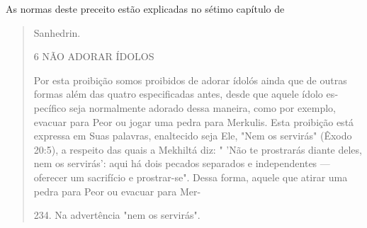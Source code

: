 As normas deste preceito estão explicadas no sétimo capítulo de

\begin{quote}
Sanhedrin.

6 NÃO ADORAR ÍDOLOS

Por esta proibição somos proibidos de adorar ídolós ainda que de outras
formas além das quatro especificadas antes, desde que aquele ídolo
es­pecífico seja normalmente adorado dessa maneira, como por exemplo,
evacuar para Peor ou jogar uma pedra para Merkulis. Esta proibição está
expressa em Suas palavras, enaltecido seja Ele, "Nem os servirás" (Êxodo
20:5), a respeito das quais a Mekhiltá diz: " 'Não te prostrarás diante
deles, nem os servirás': aqui há dois pecados separados e independentes
--- oferecer um sacrifício e prostrar-se". Dessa forma, aquele que
atirar uma pedra para Peor ou evacuar para Mer-

234. Na advertência "nem os servirás".
\end{quote}
